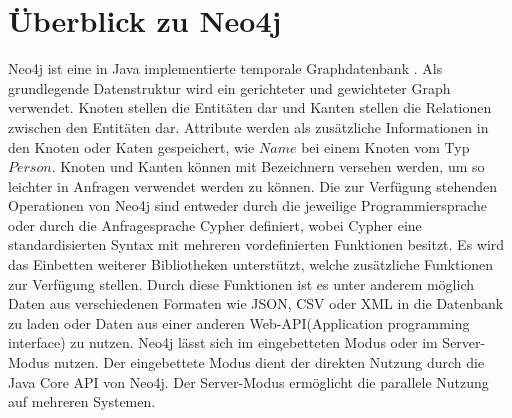 \section{Überblick zu Neo4j}
Neo4j ist eine in Java implementierte temporale Graphdatenbank \parencite{vukotic2015neo4j}. Als grundlegende Datenstruktur wird ein gerichteter und gewichteter Graph verwendet. Knoten stellen die Entitäten dar und  Kanten stellen die Relationen zwischen den Entitäten dar.  Attribute werden als zusätzliche Informationen in den Knoten oder Katen gespeichert, wie $Name$ bei einem Knoten vom Typ $Person$. Knoten und Kanten können mit Bezeichnern versehen werden, um so leichter in Anfragen  verwendet werden zu können. Die zur Verfügung stehenden Operationen von Neo4j sind entweder durch die jeweilige Programmiersprache oder durch die  Anfragesprache Cypher definiert, wobei Cypher eine standardisierten Syntax mit mehreren vordefinierten Funktionen besitzt. Es wird das Einbetten weiterer Bibliotheken unterstützt, welche  zusätzliche Funktionen zur Verfügung stellen. Durch diese Funktionen ist es unter anderem möglich Daten aus verschiedenen Formaten wie JSON, CSV oder XML in die Datenbank zu laden oder Daten aus einer anderen Web-API(Application programming interface) zu nutzen. Neo4j lässt sich im eingebetteten Modus oder im  Server-Modus nutzen. Der eingebettete Modus dient der direkten  Nutzung durch die Java Core API von Neo4j. Der Server-Modus ermöglicht die parallele Nutzung auf mehreren Systemen. 

